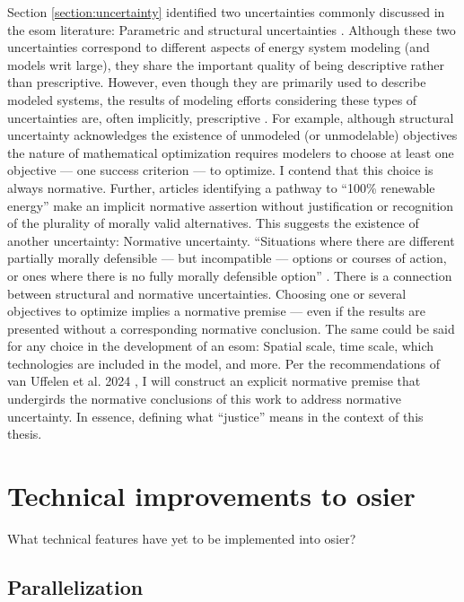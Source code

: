 Section \ref{section:uncertainty} identified two uncertainties commonly
discussed in the \ac{esom} literature: Parametric and structural uncertainties
\cite{decarolis_using_2011}. Although these two uncertainties correspond to
different aspects of energy system modeling (and models writ large), they share
the important quality of being descriptive rather than prescriptive. However,
even though they are primarily used to describe modeled systems, the results of
modeling efforts considering these types of uncertainties are, often implicitly,
prescriptive
\cite{yue_least_2020,decarolis_nc_2018,cochran_la100_2021,bussar_optimal_2014}.
For example, although structural uncertainty acknowledges the existence of
unmodeled (or unmodelable) objectives the nature of mathematical optimization
requires modelers to choose at least one objective --- one success criterion ---
to optimize. I contend that this choice is always normative. Further, articles
identifying a pathway to ``100\% renewable energy'' make an implicit normative
assertion without justification or recognition of the plurality of morally valid
alternatives. This suggests the existence of another uncertainty: Normative
uncertainty. ``Situations where there are different partially morally defensible
--- but incompatible --- options or courses of action, or ones where there is no
fully morally defensible option''
\cite{taebi_bridging_2017,van_uffelen_revisiting_2024}. There is a connection
between structural and normative uncertainties. Choosing one or several
objectives to optimize implies a normative premise --- even if the results are
presented without a corresponding normative conclusion. The same could be said
for any choice in the development of an \ac{esom}: Spatial scale, time scale,
which technologies are included in the model, and more. Per the recommendations
of van Uffelen et al. 2024 \cite{van_uffelen_revisiting_2024}, I will construct
an explicit normative premise that undergirds the normative conclusions of this
work to address normative uncertainty. In essence, defining what ``justice''
means in the context of this thesis. 


\section{Technical improvements to \ac{osier}}

What technical features have yet to be implemented into \ac{osier}?


\subsection{Parallelization}

